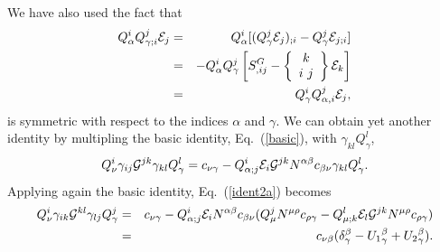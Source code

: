 \documentclass[a4paper,aps,preprint,groupedaddress,showpacs]{revtex4}
\begin{document}
We have also used the fact that
\begin{eqnarray}
Q^{i}_{\alpha}Q^{j}_{\gamma;i}{\cal E}_{j}
&=&
Q^{i}_{\alpha}[(Q^{j}_{\gamma}{\cal E}_{j})_{;i}-
Q^{j}_{\gamma}{\cal E}_{j;i}]
\nonumber\\
&=&-Q^{i}_{\alpha}Q^{j}_{\gamma}\left[S^{G}_{,ij}-
\left\{\begin{array}{c}k \\ i\ j\end{array}\right\}
{\cal E}_{k}\right]
\nonumber\\
&=&Q^{i}_{\gamma}Q^{j}_{\alpha,i}{\cal E}_{j},
\end{eqnarray}
is symmetric with respect to the indices $\alpha$ and $\gamma$.
We can obtain yet another identity by multipling the basic
identity, Eq.~(\ref{basic}), with $\gamma_{kl}Q^{l}_{\gamma}$,
\begin{equation}
Q^{i}_{\nu}\gamma_{ij}{\cal G}^{jk}\gamma_{kl}Q^{l}_{\gamma}=
c_{\nu\gamma}-Q^{i}_{\alpha;j}{\cal E}_{i}{\cal G}^{jk}
N^{\alpha\beta}c_{\beta\nu}\gamma_{kl}Q^{l}_{\gamma}.
\label{ident2a}
\end{equation}
Applying again the basic identity, Eq.~(\ref{ident2a}) becomes
\begin{eqnarray}
Q^{i}_{\nu}\gamma_{ik}{\cal G}^{kl}\gamma_{lj}Q^{j}_{\gamma}
&=&c_{\nu\gamma}-Q^{i}_{\alpha;j}{\cal E}_{i}N^{\alpha\beta}
c_{\beta\nu}
(Q^{j}_{\mu}N^{\mu\rho}c_{\rho\gamma}-
Q^{l}_{\mu;k}{\cal E}_{l}{\cal G}^{jk}N^{\mu\rho}c_{\rho\gamma})
\nonumber\\
&=&c_{\nu\beta}(\delta^{\beta}_{\gamma}-{U_{1}}^{\beta}_{\gamma}
+{U_{2}}^{\beta}_{\gamma}).
\label{ident2}
\end{eqnarray}
\end{document}
